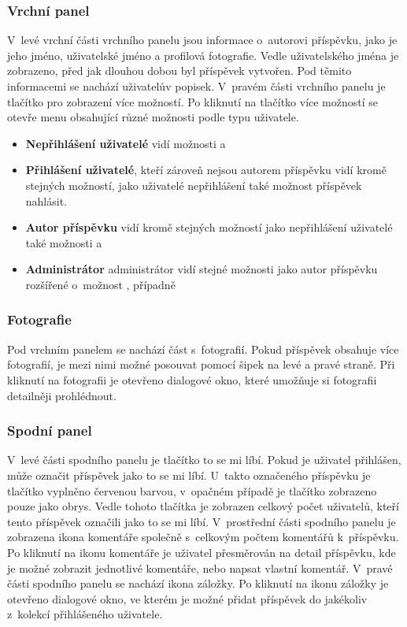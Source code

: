 \documentclass[12pt, a4paper,
  oneside,      %
]{report}
\begin{document}
\subsubsection{Vrchní panel}
V~levé vrchní části vrchního panelu jsou informace o~autorovi příspěvku, jako je jeho jméno, uživatelské jméno a profilová fotografie. Vedle uživatelského jména je zobrazeno, před jak dlouhou dobou byl příspěvek vytvořen. Pod těmito informacemi se nachází uživatelův popisek. V~pravém části vrchního panelu je tlačítko pro zobrazení více možností. Po kliknutí na tlačítko více možností se otevře menu obsahující různé možnosti podle typu uživatele.
\begin{itemize}
	\item \textbf{Nepřihlášení uživatelé} vidí možnosti  a 
	\item \textbf{Přihlášení uživatelé}, kteří zároveň nejsou autorem příspěvku vidí kromě stejných možností, jako uživatelé nepřihlášení také možnost příspěvek nahlásit.
	\item \textbf{Autor příspěvku} vidí kromě stejných možností jako nepřihlášení uživatelé také možnosti  a 
	\item \textbf{Administrátor} administrátor vidí stejné možnosti jako autor příspěvku rozšířené o~možnost , případně 
\end{itemize}
\subsubsection{Fotografie}
Pod vrchním panelem se nachází část s~fotografií. Pokud příspěvek obsahuje více fotografií, je mezi nimi možné posouvat pomocí šipek na levé a pravé straně. Při kliknutí na fotografii je otevřeno dialogové okno, které umožňuje si fotografii detailněji prohlédnout.
\subsubsection{Spodní panel}
V~levé části spodního panelu je tlačítko to se mi líbí. Pokud je uživatel přihlášen, může označit příspěvek jako to se mi líbí. U~takto označeného příspěvku je tlačítko vyplněno červenou barvou, v~opačném případě je tlačítko zobrazeno pouze jako obrys. Vedle tohoto tlačítka je zobrazen celkový počet uživatelů, kteří tento příspěvek označili jako to se mi líbí. V~prostřední části spodního panelu je zobrazena ikona komentáře společně s~celkovým počtem komentářů k~příspěvku. Po kliknutí na ikonu komentáře je uživatel přesměrován na detail příspěvku, kde je možné zobrazit jednotlivé komentáře, nebo napsat vlastní komentář. V~pravé části spodního panelu se nachází ikona záložky. Po kliknutí na ikonu záložky je otevřeno dialogové okno, ve kterém je možné přidat příspěvek do jakékoliv z~kolekcí přihlášeného uživatele.
\end{document}
